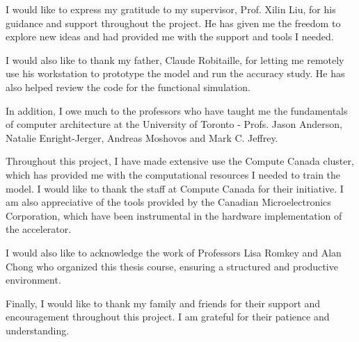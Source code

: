 I would like to express my gratitude to my supervisor, Prof. Xilin Liu, for his guidance and support throughout the project. He has given me the freedom to explore new ideas and had provided me with the
support and tools I needed.

I would also like to thank my father, Claude Robitaille, for letting me remotely use his workstation to prototype the model and run the accuracy study. He has also helped review the code for the functional simulation.

In addition, I owe much to the professors who have taught me the fundamentals of computer architecture at the University of Toronto - Profs. Jason Anderson, Natalie Enright-Jerger, Andreas Moshovos and Mark C. Jeffrey.

Throughout this project, I have made extensive use the Compute Canada cluster, which has provided me with the computational resources I needed to train the model. I would like to thank the 
staff at Compute Canada for their initiative. I am also appreciative of the tools provided by the Canadian Microelectronics Corporation, which have been instrumental in the hardware implementation of the accelerator.

I would also like to acknowledge the work of Professors Lisa Romkey and Alan Chong who organized this thesis course, ensuring a structured and productive environment.

Finally, I would like to thank my family and friends for their support and encouragement throughout this project. I am grateful for their patience and understanding.
